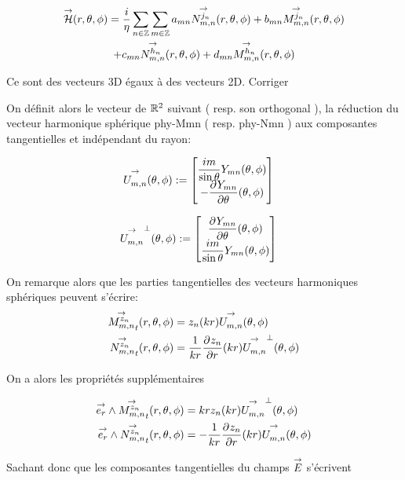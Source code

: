         \begin{multline}
            \vH(\rtp) = \frac{i}{\eta}\sum_{n\in\ZZ}\sum_{m\in\ZZ} a_{mn} \Nmn[j_n](\rtp) + b_{mn} \Mmn[j_n](\rtp)
            \\
            + c_{mn} \Nmn[h_n](\rtp) + d_{mn} \Mmn[h_n](\rtp)
        \end{multline}

        \begin{TODO}
            Ce sont des vecteurs 3D égaux à des vecteurs 2D. Corriger
        \end{TODO}

        On définit alors le vecteur de \(\RR^2\) suivant ( resp. son orthogonal ), la réduction du vecteur harmonique sphérique \gls{phy-Mmn} ( resp. \gls{phy-Nmn} ) aux composantes tangentielles et indépendant du rayon:

        \begin{align}
            \label{eq:defUmn_tgt}
            \Umn(\tp) &:= 
            \begin{bmatrix}
                \frac{im}{\sin\theta}Y_{mn}(\tp)
                \\
                - \ddr{\theta}{Y_{mn}}(\tp)
            \end{bmatrix}
        \end{align}

        \begin{align}
        \label{eq:defNmn_tgt}
          \Umn^\perp(\tp) &:=
          \begin{bmatrix}
            \ddr{\theta}{Y_{mn}}(\tp)
            \\
            \frac{im}{\sin\theta}Y_{mn}(\tp)
          \end{bmatrix}
        \end{align}


        On remarque alors que les parties tangentielles des vecteurs harmoniques sphériques peuvent s'écrire:
        \begin{align}
          \Mmn[z_n]_t(\rtp) &= z_n(kr)\Umn(\tp)
          \\
          \Nmn[z_n]_t(\rtp) &= \frac{1}{kr}\ddr{r}{z_n}(kr)\Umn^\perp(\tp)
        \end{align}

        On a alors les propriétés supplémentaires
        \begin{prop}
            \label{prop:Mmn_Nmn_vect}
            \begin{align}
              \vect{e_r} \pvect \Mmn[z_n]_t(\rtp) &= krz_n(kr)\Umn^\perp(\tp)
              \\
              \vect{e_r} \pvect \Nmn[z_n]_t(\rtp) &= -\frac{1}{kr}\ddr{r}{z_n}(kr)\Umn(\tp)
            \end{align}
        \end{prop}
        Sachant donc que les composantes tangentielles du champs \(\vE\) s'écrivent

